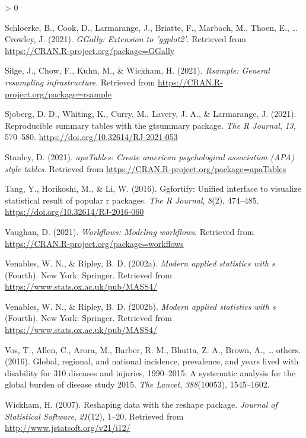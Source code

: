 \documentclass[
  english,
  doc,floatsintext]{apa6}
\newlength{\cslhangindent}
\newenvironment{CSLReferences}[2] %
 {%
  \setlength{\parindent}{0pt}
  \ifodd #1 \everypar{\setlength{\hangindent}{\cslhangindent}}\ignorespaces\fi
  \ifnum #2 > 0
  \setlength{\parskip}{#2\baselineskip}
  \fi
 }%
 {}
\begin{document}
\begin{CSLReferences}{1}{0}
\leavevmode\hypertarget{ref-R-GGally}{}%
Schloerke, B., Cook, D., Larmarange, J., Briatte, F., Marbach, M., Thoen, E., \ldots{} Crowley, J. (2021). \emph{GGally: Extension to 'ggplot2'}. Retrieved from \url{https://CRAN.R-project.org/package=GGally}

\leavevmode\hypertarget{ref-R-rsample}{}%
Silge, J., Chow, F., Kuhn, M., \& Wickham, H. (2021). \emph{Rsample: General resampling infrastructure}. Retrieved from \url{https://CRAN.R-project.org/package=rsample}

\leavevmode\hypertarget{ref-R-gtsummary}{}%
Sjoberg, D. D., Whiting, K., Curry, M., Lavery, J. A., \& Larmarange, J. (2021). Reproducible summary tables with the gtsummary package. \emph{{The R Journal}}, \emph{13}, 570--580. \url{https://doi.org/10.32614/RJ-2021-053}

\leavevmode\hypertarget{ref-R-apaTables}{}%
Stanley, D. (2021). \emph{apaTables: Create american psychological association (APA) style tables}. Retrieved from \url{https://CRAN.R-project.org/package=apaTables}

\leavevmode\hypertarget{ref-R-ggfortify}{}%
Tang, Y., Horikoshi, M., \& Li, W. (2016). Ggfortify: Unified interface to visualize statistical result of popular r packages. \emph{The R Journal}, \emph{8}(2), 474--485. \url{https://doi.org/10.32614/RJ-2016-060}

\leavevmode\hypertarget{ref-R-workflows}{}%
Vaughan, D. (2021). \emph{Workflows: Modeling workflows}. Retrieved from \url{https://CRAN.R-project.org/package=workflows}

\leavevmode\hypertarget{ref-R-MASS}{}%
Venables, W. N., \& Ripley, B. D. (2002a). \emph{Modern applied statistics with s} (Fourth). New York: Springer. Retrieved from \url{https://www.stats.ox.ac.uk/pub/MASS4/}

\leavevmode\hypertarget{ref-R-nnet}{}%
Venables, W. N., \& Ripley, B. D. (2002b). \emph{Modern applied statistics with s} (Fourth). New York: Springer. Retrieved from \url{https://www.stats.ox.ac.uk/pub/MASS4/}

\leavevmode\hypertarget{ref-vos2016global}{}%
Vos, T., Allen, C., Arora, M., Barber, R. M., Bhutta, Z. A., Brown, A., \ldots{} others. (2016). Global, regional, and national incidence, prevalence, and years lived with disability for 310 diseases and injuries, 1990--2015: A systematic analysis for the global burden of disease study 2015. \emph{The Lancet}, \emph{388}(10053), 1545--1602.

\leavevmode\hypertarget{ref-R-reshape2}{}%
Wickham, H. (2007). Reshaping data with the {reshape} package. \emph{Journal of Statistical Software}, \emph{21}(12), 1--20. Retrieved from \url{http://www.jstatsoft.org/v21/i12/}


\end{CSLReferences}
\end{document}
